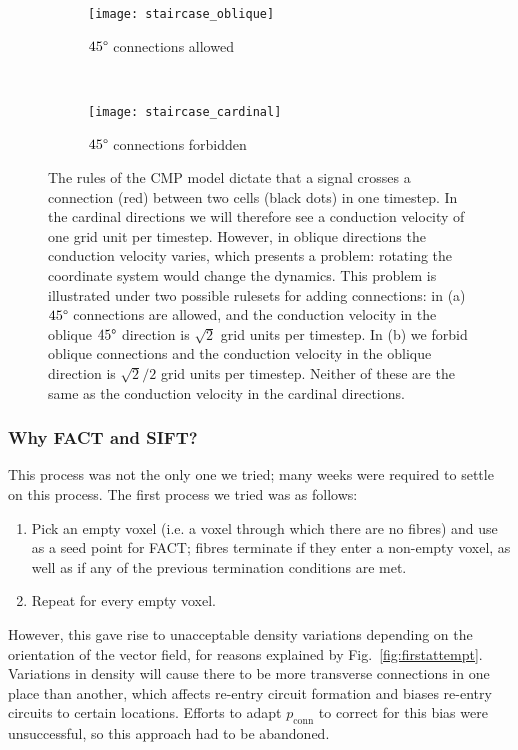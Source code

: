 \begin{figure}[H] \begin{mdframed}
    \centering
    \begin{subfigure}[b]{0.46\textwidth}
        \texttt{[image: staircase\_oblique]}
        \caption{$45\degree$ connections allowed}
    \end{subfigure}
    ~
    \begin{subfigure}[b]{0.46\textwidth}
        \texttt{[image: staircase\_cardinal]}
        \caption{$45\degree$ connections forbidden}
    \end{subfigure}
    \caption{The rules of the CMP model dictate that a signal crosses a connection (red) between two cells (black dots) in one timestep. In the cardinal directions we will therefore see a conduction velocity of one grid unit per timestep. However, in oblique directions the conduction velocity varies, which presents a problem: rotating the coordinate system would change the dynamics. This problem is illustrated under two possible rulesets for adding connections: in (a) $45\degree$ connections are allowed, and the conduction velocity in the oblique $45\degree$ direction is $\sqrt{2}$ grid units per timestep. In (b) we forbid oblique connections and the conduction velocity in the oblique direction is $\sqrt{2} / 2$ grid units per timestep. Neither of these are the same as the conduction velocity in the cardinal directions.}
    \label{fig:staircase}
\end{mdframed} \end{figure}

\subsubsection*{Why FACT and SIFT?}

This process was not the only one we tried; many weeks were required to settle on this process. The first process we tried was as follows:
\begin{enumerate}
    \item Pick an empty voxel (i.e. a voxel through which there are no fibres) and use as a seed point for FACT; fibres terminate if they enter a non-empty voxel, as well as if any of the previous termination conditions are met.
    \item Repeat for every empty voxel.
\end{enumerate}
However, this gave rise to unacceptable density variations depending on the orientation of the vector field, for reasons explained by Fig.~\ref{fig:firstattempt}. Variations in density will cause there to be more transverse connections in one place than another, which affects re-entry circuit formation and biases re-entry circuits to certain locations. Efforts to adapt $p_\text{conn}$ to correct for this bias were unsuccessful, so this approach had to be abandoned.

